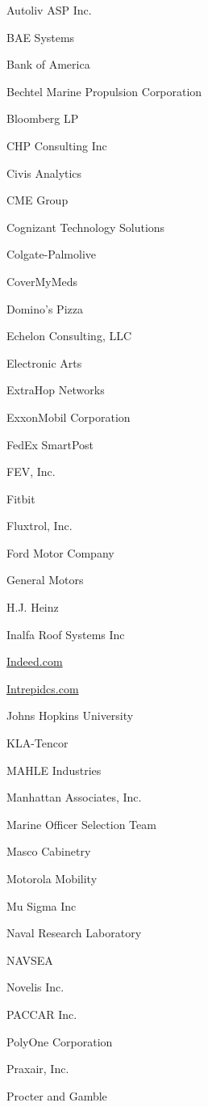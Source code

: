 \documentclass[twoside]{article}
\begin{document}
\begin{center}
\begin{multicols}{5}
\begin{FlushLeft}
\begin{compactitem}
\item Autoliv ASP Inc.
\item BAE Systems
\item Bank of America
\item Bechtel Marine Propulsion Corporation
\item Bloomberg LP
\item CHP Consulting Inc
\item Civis Analytics
\item CME Group
\item Cognizant Technology Solutions
\item Colgate-Palmolive
\item CoverMyMeds
\item Domino's Pizza
\item Echelon Consulting, LLC
\item Electronic Arts
\item ExtraHop Networks
\item ExxonMobil Corporation
\item FedEx SmartPost
\item FEV, Inc.
\item Fitbit
\item Fluxtrol, Inc.
\item Ford Motor Company
\item General Motors
\item H.J. Heinz
\item Inalfa Roof Systems Inc
\item \url{Indeed.com}
\item \url{Intrepidcs.com}
\item Johns Hopkins University
\item KLA-Tencor
\item MAHLE Industries
\item Manhattan Associates, Inc.
\item Marine Officer Selection Team
\item Masco Cabinetry
\item Motorola Mobility
\item Mu Sigma Inc
\item Naval Research Laboratory
\item NAVSEA
\item Novelis Inc.
\item PACCAR Inc.
\item PolyOne Corporation
\item Praxair, Inc.
\item Procter and Gamble

\end{compactitem}
\end{FlushLeft}
\end{multicols}
\end{center}
\end{document}
